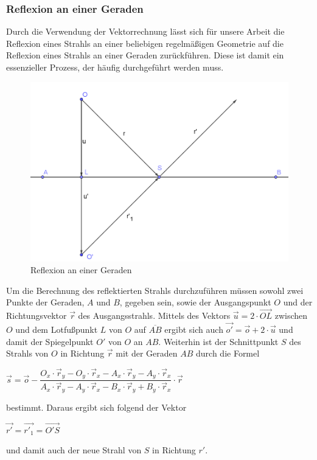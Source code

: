 \documentclass[reducespace,stylepage,semiarbeit]{spezidoc}
\begin{document}
\subsubsection{Reflexion an einer Geraden}
Durch die Verwendung der Vektorrechnung lässt sich für unsere Arbeit die Reflexion eines Strahls an einer beliebigen regelmäßigen Geometrie auf die Reflexion eines Strahls an einer Geraden zurückführen. 
Diese ist damit ein essenzieller Prozess, der häufig durchgeführt werden muss.\\
\begin{figure}
\includegraphics[scale=0.4]{pictures/LineRef.png}
\caption{Reflexion an einer Geraden}
\end{figure}
Um die Berechnung des reflektierten Strahls durchzuführen müssen sowohl zwei Punkte der Geraden, $A$ und $B$, gegeben sein, sowie der Ausgangspunkt $O$ und der Richtungsvektor $\vec{r}$ des Ausgangsstrahls. 
Mittels des Vektors $\vec{u} = 2\cdot\overrightarrow{OL}$ zwischen $O$ und dem Lotfußpunkt $L$ von $O$ auf $\overline{AB}$ ergibt sich auch $\vec{o'} = \vec{o} + 2\cdot\vec{u}$ und damit der Spiegelpunkt $O'$ von $O$ an $AB$.
Weiterhin ist der Schnittpunkt $S$ des Strahls von $O$ in Richtung $\vec{r}$ mit der Geraden $AB$ durch die Formel
\begin{center}
$\vec{s} = \vec{o} - \dfrac{O_x \cdot \vec{r}_y - O_y \cdot \vec{r}_x - A_x \cdot \vec{r}_y - A_y \cdot \vec{r}_x}{A_x \cdot \vec{r}_y - A_y \cdot \vec{r}_x - B_x \cdot \vec{r}_y + B_y \cdot \vec{r}_x} \cdot \vec{r}$
\end{center}
bestimmt. 
Daraus ergibt sich folgend der Vektor
\begin{center}
$\vec{r'} = \vec{r'_1} = \overrightarrow{O'S}$
\end{center}
und damit auch der neue Strahl von $S$ in Richtung $r'$.
\end{document}
